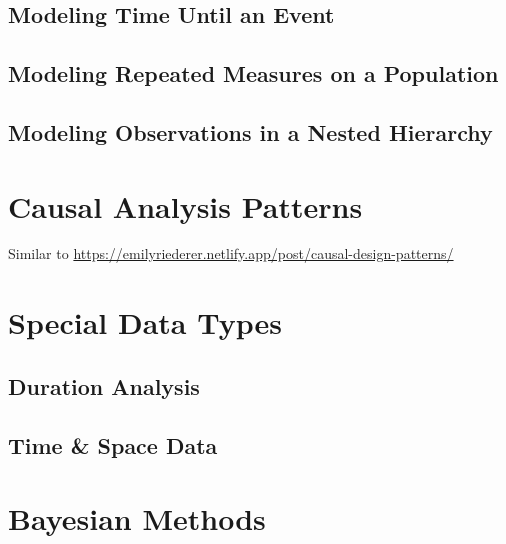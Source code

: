 \documentclass[
]{krantz}
\begin{document}
\hypertarget{modeling-time-until-an-event}{%
\subsection{Modeling Time Until an Event}\label{modeling-time-until-an-event}}

\hypertarget{modeling-repeated-measures-on-a-population}{%
\subsection{Modeling Repeated Measures on a Population}\label{modeling-repeated-measures-on-a-population}}

\hypertarget{modeling-observations-in-a-nested-hierarchy}{%
\subsection{Modeling Observations in a Nested Hierarchy}\label{modeling-observations-in-a-nested-hierarchy}}

\hypertarget{causal-analysis-patterns}{%
\section{Causal Analysis Patterns}\label{causal-analysis-patterns}}

Similar to \url{https://emilyriederer.netlify.app/post/causal-design-patterns/}

\hypertarget{special-data-types}{%
\section{Special Data Types}\label{special-data-types}}

\hypertarget{duration-analysis}{%
\subsection{Duration Analysis}\label{duration-analysis}}

\hypertarget{time-space-data}{%
\subsection{Time \& Space Data}\label{time-space-data}}

\hypertarget{bayesian-methods}{%
\section{Bayesian Methods}\label{bayesian-methods}}
\end{document}
